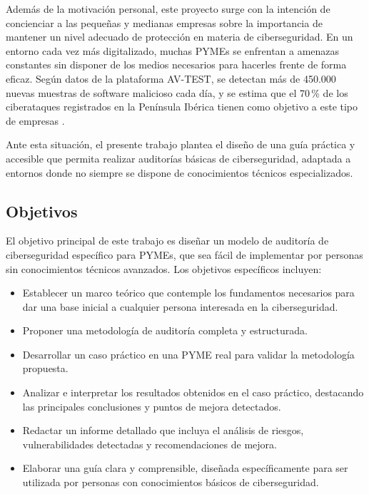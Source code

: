 \documentclass[a4paper, 11pt]{article}
\begin{document}
\par\vspace{0.5cm}
Además de la motivación personal, este proyecto surge con la intención de concienciar a las pequeñas y medianas empresas sobre la importancia de mantener un nivel adecuado de protección en materia de ciberseguridad. En un entorno cada vez más digitalizado, muchas PYMEs se enfrentan a amenazas constantes sin disponer de los medios necesarios para hacerles frente de forma eficaz. Según datos de la plataforma AV-TEST, se detectan más de 450.000 nuevas muestras de software malicioso cada día, y se estima que el 70\,\% de los ciberataques registrados en la Península Ibérica tienen como objetivo a este tipo de empresas \cite{avtest}. 
\par\vspace{0.5cm}

Ante esta situación, el presente trabajo plantea el diseño de una guía práctica y accesible que permita realizar auditorías básicas de ciberseguridad, adaptada a entornos donde no siempre se dispone de conocimientos técnicos especializados.

\subsection{Objetivos}
\par\vspace{0.5cm}

El objetivo principal de este trabajo es diseñar un modelo de auditoría de ciberseguridad específico para PYMEs, que sea fácil de implementar por personas sin conocimientos técnicos avanzados. Los objetivos específicos incluyen:

\begin{itemize}
    \item Establecer un marco teórico que contemple los fundamentos necesarios para dar una base inicial a cualquier persona interesada en la ciberseguridad.
    \item Proponer una metodología de auditoría completa y estructurada.
    \item Desarrollar un caso práctico en una PYME real para validar la metodología propuesta.
    \item Analizar e interpretar los resultados obtenidos en el caso práctico, destacando las principales conclusiones y puntos de mejora detectados.

    \item Redactar un informe detallado que incluya el análisis de riesgos, vulnerabilidades detectadas y recomendaciones de mejora.
    \item Elaborar una guía clara y comprensible, diseñada específicamente para ser utilizada por personas con conocimientos básicos de ciberseguridad.
\end{itemize}
\end{document}
